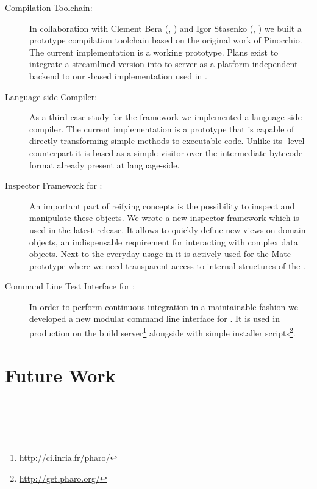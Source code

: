 \begin{description}
	\item[\VirtualCPU Compilation Toolchain:]
		In collaboration with Clement Bera (\RMoD, \INRIA) and Igor Stasenko (\RMoD, \INRIA) we built a prototype compilation toolchain based on the original work of Pinocchio.
		The current implementation is a working prototype.
		Plans exist to integrate a streamlined version into \PH to server as a platform independent backend to our \B-based \FFI implementation used in \PH.

	\item[\NBJ Language-side \JIT Compiler:]
		As a third case study for the \B framework we implemented a language-side \JIT compiler. 
		The current implementation is a prototype that is capable of directly transforming simple methods to executable code.
		Unlike its \VM-level counterpart it is based as a simple visitor over the intermediate bytecode format already present at language-side.

	\item[Inspector Framework for \PH:] 
		An important part of reifying concepts is the possibility to inspect and manipulate these objects.
		We wrote a new inspector framework which is used in the latest \PH release.
		It allows to quickly define new views on domain objects, an indispensable requirement for interacting with complex data objects.
		Next to the everyday usage in \PH it is actively used for the Mate \VM prototype where we need transparent access to internal structures of the \VM.

	\item[Command Line Test Interface for \PH:]
		In order to perform continuous integration in a maintainable fashion we developed a new modular command line interface for \PH. 
		It is used in production on the \PH build server\footnote{\url{http://ci.inria.fr/pharo/}} alongside with simple installer scripts\footnote{\url{http://get.pharo.org/}}.
\end{description}


\section{Future Work}
 \\
 \\
 \\


